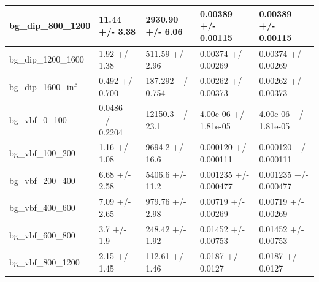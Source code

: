 \documentclass[a4paper, 10pt]{article}
\begin{document}
\begin{table}[H]
\begin{center}
\begin{tabular}{|m{20.0mm}|m{27.0mm}|m{27.0mm}|m{33.0mm}|m{32.0mm}|}
      \hline
      {\cellcolor{white}         bg\_dip\_800\_1200}& {\cellcolor{white}         11.44 +/\-- 3.38}& {\cellcolor{white}         2930.90 +/\-- 6.06}& {\cellcolor{white}         0.00389 +/\-- 0.00115}& {\cellcolor{white}         0.00389 +/\-- 0.00115}\\
      \hline
      {\cellcolor{white}         bg\_dip\_1200\_1600}& {\cellcolor{white}         1.92 +/\-- 1.38}& {\cellcolor{white}         511.59 +/\-- 2.96}& {\cellcolor{white}         0.00374 +/\-- 0.00269}& {\cellcolor{white}         0.00374 +/\-- 0.00269}\\
      \hline
      {\cellcolor{white}         bg\_dip\_1600\_inf}& {\cellcolor{white}         0.492 +/\-- 0.700}& {\cellcolor{white}         187.292 +/\-- 0.754}& {\cellcolor{white}         0.00262 +/\-- 0.00373}& {\cellcolor{white}         0.00262 +/\-- 0.00373}\\
      \hline
      {\cellcolor{white}         bg\_vbf\_0\_100}& {\cellcolor{white}         0.0486 +/\-- 0.2204}& {\cellcolor{white}         12150.3 +/\-- 23.1}& {\cellcolor{white}         4.00e-06 +/\-- 1.81e-05}& {\cellcolor{white}         4.00e-06 +/\-- 1.81e-05}\\
      \hline
      {\cellcolor{white}         bg\_vbf\_100\_200}& {\cellcolor{white}         1.16 +/\-- 1.08}& {\cellcolor{white}         9694.2 +/\-- 16.6}& {\cellcolor{white}         0.000120 +/\-- 0.000111}& {\cellcolor{white}         0.000120 +/\-- 0.000111}\\
      \hline
      {\cellcolor{white}         bg\_vbf\_200\_400}& {\cellcolor{white}         6.68 +/\-- 2.58}& {\cellcolor{white}         5406.6 +/\-- 11.2}& {\cellcolor{white}         0.001235 +/\-- 0.000477}& {\cellcolor{white}         0.001235 +/\-- 0.000477}\\
      \hline
      {\cellcolor{white}         bg\_vbf\_400\_600}& {\cellcolor{white}         7.09 +/\-- 2.65}& {\cellcolor{white}         979.76 +/\-- 2.98}& {\cellcolor{white}         0.00719 +/\-- 0.00269}& {\cellcolor{white}         0.00719 +/\-- 0.00269}\\
      \hline
      {\cellcolor{white}         bg\_vbf\_600\_800}& {\cellcolor{white}         3.7 +/\-- 1.9}& {\cellcolor{white}         248.42 +/\-- 1.92}& {\cellcolor{white}         0.01452 +/\-- 0.00753}& {\cellcolor{white}         0.01452 +/\-- 0.00753}\\
      \hline
      {\cellcolor{white}         bg\_vbf\_800\_1200}& {\cellcolor{white}         2.15 +/\-- 1.45}& {\cellcolor{white}         112.61 +/\-- 1.46}& {\cellcolor{white}         0.0187 +/\-- 0.0127}& {\cellcolor{white}         0.0187 +/\-- 0.0127}\\

\end{tabular}
\end{center}
\end{table}
\end{document}
